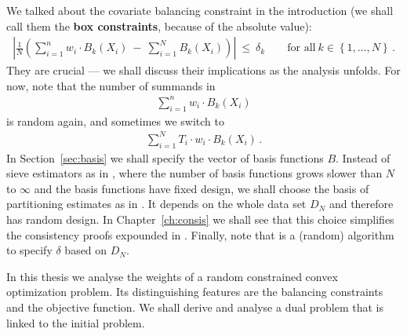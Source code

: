 We talked about the covariate balancing constraint
in the introduction
(we shall call them the \textbf{box constraints}, because of the absolute value):
\begin{gather*}
    \left| 
      \frac{1}{N} 
      \left( 
      \sum_{i = 1}^{n} 
      w_i
      \cdot
      B_k(X_i)
      \ 
      -
      \ 
      \sum_{i=1}^{N} 
      B_k(X_i)
      \right)
    \right|
    \ 
    \le 
    \ 
    \delta_k
    \qquad
    \text{for all}\ 
    k \in \left\{ 1, \ldots, N\right\}
    \,.
\end{gather*}
They are crucial --- we shall discuss their implications as the analysis unfolds.
For now, note that the number of summands in
\begin{gather*}
      \sum_{i = 1}^{n} 
      w_i
      \cdot
      B_k(X_i)
\end{gather*}
is random again, and sometimes we switch to
\begin{gather*}
      \sum_{i = 1}^{N} 
      T_i
      \cdot
      w_i
      \cdot
      B_k(X_i)
      \,.
\end{gather*}
In Section~\ref{sec:basis} we shall specify the vector of basis functions $B$.
Instead of sieve estimators as in \cite{Wang2019}, where the number of basis functions grows slower than $N$ to $\infty$ 
and the basis functions have fixed design,
we shall choose the basis of partitioning estimates as in \cite[§4]{Gyorfi2002}.
It depends on the whole data set $D_N$
and therefore has random design.
In Chapter~\ref{ch:consis} we shall see that this choice simplifies the consistency proofs expounded in \cite[Proof of Lemma~2]{Wang2019}.
Finally, note that \cite[Algorithm~1 on page 11]{Wang2019}
is a (random) algorithm to specify $\delta$ based on $D_N$. 
\begin{takeaways}
  In this thesis we analyse the weights of a random constrained convex optimization problem.
  Its distinguishing features are the balancing constraints and the objective function.
  We shall derive and analyse a dual problem that is linked to the initial problem.
\end{takeaways}
